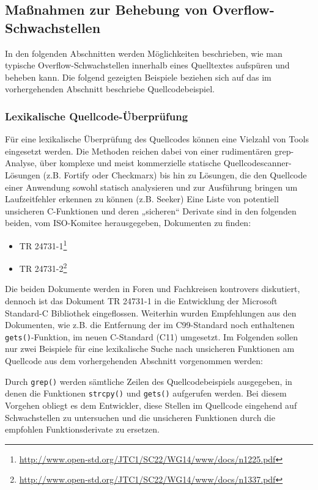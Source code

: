 \subsection{Maßnahmen zur Behebung von Overflow-Schwachstellen}

In den folgenden Abschnitten werden Möglichkeiten beschrieben, wie man 
typische Overflow-Schwachstellen innerhalb eines Quelltextes aufspüren 
und beheben kann. Die folgend gezeigten Beispiele beziehen sich auf das 
im vorhergehenden Abschnitt beschriebe Quellcodebeispiel.

\subsubsection{Lexikalische Quellcode-Überprüfung}

Für eine lexikalische Überprüfung des Quellcodes können eine Vielzahl 
von Tools eingesetzt werden. Die Methoden reichen dabei von einer 
rudimentären grep-Analyse, über komplexe und meist kommerzielle 
statische Quellcodescanner-Lösungen (z.B. Fortify oder Checkmarx) 
bis hin zu Lösungen, die den Quellcode einer Anwendung sowohl statisch 
analysieren und zur Ausführung bringen um Laufzeitfehler erkennen zu 
können (z.B. Seeker)
Eine Liste von potentiell unsicheren C-Funktionen und deren „sicheren“ 
Derivate sind in den folgenden beiden, vom ISO-Komitee herausgegeben, 
Dokumenten zu finden:

\begin{itemize}
      \item TR 24731-1\footnote{\url{http://www.open-std.org/JTC1/SC22/WG14/www/docs/n1225.pdf}}   
      \item TR 24731-2\footnote{\url{http://www.open-std.org/JTC1/SC22/WG14/www/docs/n1337.pdf}}
\end{itemize}
	
Die beiden Dokumente werden in Foren und Fachkreisen kontrovers 
diskutiert, dennoch ist das Dokument TR 24731-1 in die Entwicklung 
der Microsoft Standard-C Bibliothek eingeflossen. Weiterhin wurden 
Empfehlungen aus den Dokumenten, wie z.B. die Entfernung der im 
C99-Standard noch enthaltenen \texttt{gets()}-Funktion, im neuen 
C-Standard (C11) umgesetzt.
Im Folgenden sollen nur zwei Beispiele für eine lexikalische Suche 
nach unsicheren Funktionen am Quellcode aus dem vorhergehenden 
Abschnitt vorgenommen werden:
\par\medskip 
Durch \texttt{grep()} werden sämtliche Zeilen des Quellcodebeispiels 
ausgegeben, in denen die Funktionen \texttt{strcpy()} und \texttt{gets()} 
aufgerufen werden. Bei diesem Vorgehen obliegt es dem Entwickler, diese 
Stellen im Quellcode eingehend auf Schwachstellen zu untersuchen und 
die unsicheren Funktionen durch die empfohlen Funktionsderivate zu 
ersetzen.

